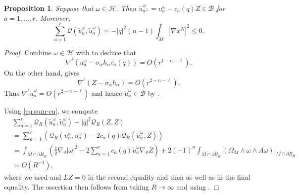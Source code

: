 \documentclass[11pt]{amsart}
\numberwithin{equation}{section}
\theoremstyle{plain}
\newtheorem{proposition}[proposition]{Proposition}
\theoremstyle{definition}
\theoremstyle{remark}
\newcommand{\Hcal}{\mathcal H}
\newcommand{\Qcal}{\mathcal Q}
\newcommand{\Bcal}{\mathcal B}
\begin{document}
\begin{proposition}\label{prop:sum-Q-leq0}
Suppose that $\omega \in \Hcal$. Then $\tilde u_a^\omega : = u_a^\omega - c_a(q) Z \in \Bcal$ for $a =1,\dots,r$. Moreover,
\[
\sum_{a=1}^r \Qcal(\tilde u_a^\omega,\tilde u_a^\omega) = -  |q|^2(n-1) \int_{M} |\nabla x^N|^2 \leq 0. 
\]
\end{proposition} 
\begin{proof}
Combine $\omega\in \Hcal$ with  to deduce that 
\[
\nabla^\ell(u^\omega_a - \sigma_\alpha h_\alpha c_a(q)) = O(r^{1-n-\ell}).
\]
On the other hand,  gives
\[
\nabla^\ell(Z- \sigma_\alpha h_\alpha) = O(r^{2-n-\ell}).
\]
Thus $\nabla^\ell \tilde u^\omega_a = O(r^{2-n-\ell})$ and hence $\tilde u^\omega_a \in \Bcal$ by . 

Using \eqref{eq:sum-cq}, we compute
\begin{align*}
& \sum_{a=1}^r \Qcal_R(\tilde u^\omega_a,\tilde u^\omega_a) + |q|^2 \Qcal_R(Z,Z)  \\
& = \sum_{a=1}^r (\Qcal_R( u^\omega_a, u^\omega_a) - 2 c_a(q) \Qcal_R(\tilde u^\omega_a,Z) )\\
& = \int_{M\cap\partial B_R}\left(  \frac 12 \nabla_\vartheta |\omega|^2 - 2 \sum_{a=1}^r c_a(q) \tilde u^\omega_a \nabla_\vartheta Z\right) + 2(-1)^n \int_{M\cap \partial B_R} (\Omega_M \wedge \omega\wedge A\omega)|_{M \cap \partial B_R} \\
& = O(R^{-1}) ,
\end{align*}
where we used  and $LZ=0$ in the second equality and then  as well as  in the final equality. The assertion then follows from taking $R\to\infty$ and using . 
\end{proof}
\end{document}

